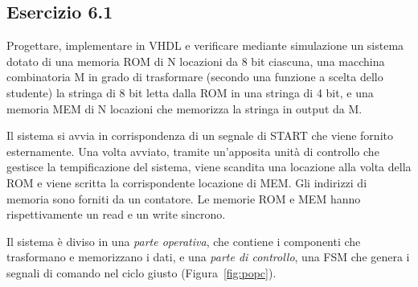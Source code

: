 \subsection{Esercizio 6.1}

\begin{traccia}
	Progettare, implementare in VHDL e verificare mediante simulazione un sistema dotato di una
	memoria ROM di N locazioni da 8 bit ciascuna, una macchina combinatoria M in grado di
	trasformare (secondo una funzione a scelta dello studente) la stringa di 8 bit letta dalla
	ROM in una stringa di 4 bit, e una memoria MEM di N locazioni che memorizza la stringa in
	output da M.

	Il sistema si avvia in corrispondenza di un segnale di START che viene fornito esternamente.
	Una volta avviato, tramite un'apposita unità di controllo che gestisce la tempificazione del
	sistema, viene scandita una locazione alla volta della ROM e viene scritta la corrispondente
	locazione di MEM. Gli indirizzi di memoria sono forniti da un contatore. Le memorie ROM e
	MEM hanno rispettivamente un read e un write sincrono.
\end{traccia}

\progetto

Il sistema è diviso in una \emph{parte operativa}, che contiene i componenti che trasformano
e memorizzano i dati, e una \emph{parte di controllo}, una FSM che genera i segnali di
comando nel ciclo giusto (Figura~\ref{fig:popc}).

